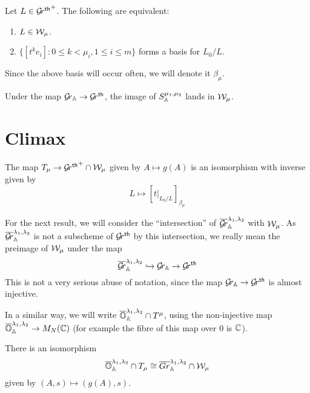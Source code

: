\documentclass[draft]{article}
\begin{document}
\begin{lemma} \label{le:Wmu}
    Let $ L \in \Grth^+$.  The following are equivalent:
    \begin{enumerate}
        \item $ L \in \cW_\mu$.
        \item $ \{ [t^k e_i] : 0 \le k < \mu_i, 1 \le i \le m\}$ forms a basis for $ L_0/L$.
    \end{enumerate}
\end{lemma}

Since the above basis will occur often, we will denote it  $ \beta_\mu$.

\begin{lemma}
    Under the map $ \Grbd \rightarrow \Grth$, the image of $ S^{\mu_1, \mu_2}_\AA$ lands in $ \cW_\mu$.
\end{lemma}

\section{Climax}

\begin{theorem} 
The map $ T_\mu \rightarrow \Grth^+ \cap \cW_\mu $ given by $ A \mapsto g(A) $ is an isomorphism with inverse given by
$$ L \mapsto [t|_{L_0/L} ]_{\beta_\mu}$$
\end{theorem}


For the next result, we will consider the ``intersection'' of $ \overline{\Gr}^{\lambda_1, \lambda_2}_\AA $ with $\cW_\mu$.  As $  \overline{\Gr}^{\lambda_1, \lambda_2}_\AA $ is not a subscheme of $ \Grth$ by this intersection, we really mean the preimage of $ \cW_\mu$ under the map $$ \overline{\Gr}^{\lambda_1, \lambda_2}_\AA  \hookrightarrow \Grbd \rightarrow \Grth$$
This is not a very serious abuse of notation, since the map $ \Grbd \rightarrow \Grth $ is almost injective.

In a similar way, we will write $ \overline{\OO}^{\lambda_1, \lambda_2}_\AA \cap T^\mu$, using the non-injective map $ \overline{\OO}^{\lambda_1, \lambda_2}_\AA \rightarrow M_N(\CC)$ (for example the fibre of this map over $ 0 $ is $ \CC $).

\begin{theorem} \label{th:OGrl}
    There is an isomorphism
    $$\overline{\OO}^{\lambda_1, \lambda_2}_\AA \cap T_\mu \cong \overline{Gr}^{\lambda_1, \lambda_2}_\AA \cap \cW_\mu $$
    given by $ (A,s) \mapsto (g(A), s)$.
\end{theorem}
\end{document}
